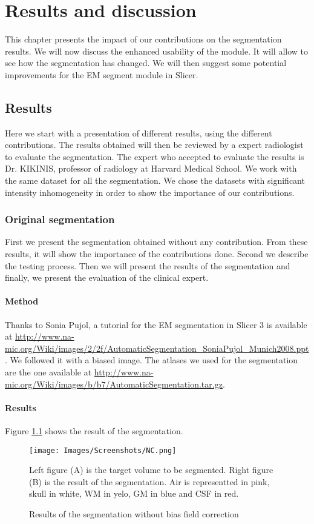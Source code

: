 \chapter{Results and discussion}\label{sec:results}
This chapter presents the impact of our contributions on the segmentation results. We will now discuss the enhanced usability of the module. It will allow to see how the segmentation has changed. We will then suggest some potential improvements for the EM segment module in Slicer. 

%
\section{Results}
%
Here we start with a presentation of different results, using the different contributions. The results obtained will then be reviewed by a expert radiologist to evaluate the segmentation. The expert who accepted to evaluate the results is Dr. KIKINIS, professor of radiology at Harvard Medical School. We work with the same dataset for all the segmentation. We chose the datasets with significant intensity inhomogeneity in order to show the importance of our contributions.
%
\subsection{Original segmentation}
First we present the segmentation obtained without any contribution. From these results, it will show the importance of the contributions done. Second we describe the testing process. Then we will present the results of the segmentation and finally, we present the evaluation of the clinical expert.
\subsubsection{Method}
Thanks to Sonia Pujol, a tutorial for the EM segmentation in Slicer 3 is available at \url{http://www.na-mic.org/Wiki/images/2/2f/AutomaticSegmentation_SoniaPujol_Munich2008.ppt}. We followed it with a biased image. The atlases we used for the segmentation are the one available at \url{http://www.na-mic.org/Wiki/images/b/b7/AutomaticSegmentation.tar.gz}.

\subsubsection{Results}
Figure \ref{fig:NC} shows the result of the segmentation.
  \begin{figure}\centering
  \texttt{[image: Images/Screenshots/NC.png]}
  \caption{Results of the segmentation without bias field correction}{Left figure (A) is the target volume to be segmented. Right figure (B) is the result of the segmentation. Air is representted in pink, skull in white, WM in yelo, GM in blue and CSF in red.}\label{fig:NC}
  \end{figure}
  
